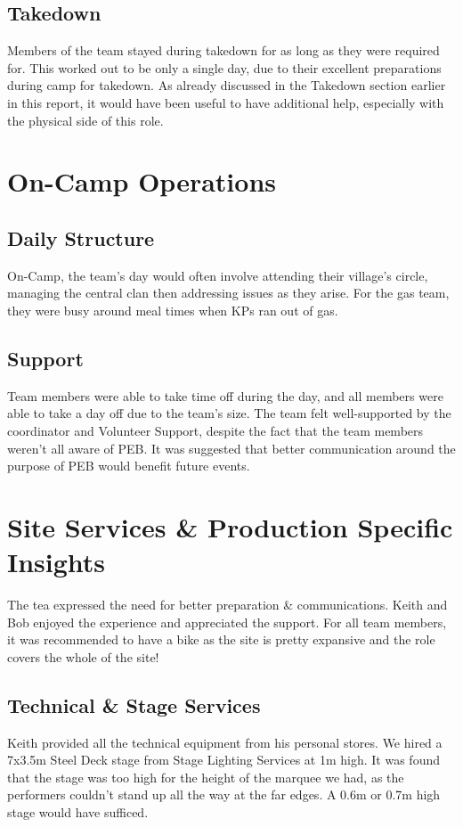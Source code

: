 \subsection{Takedown}
Members of the team stayed during takedown for as long as they were required for. This worked out to be only a single day, due to their excellent preparations during camp for takedown. As already discussed in the Takedown section earlier in this report, it would have been useful to have additional help, especially with the physical side of this role. 

\section{On-Camp Operations}
\subsection{Daily Structure}
On-Camp, the team's day would often involve attending their village's circle, managing the central clan then addressing issues as they arise. For the gas team, they were busy around meal times when KPs ran out of gas. 
\subsection{Support}
Team members were able to take time off during the day, and all members were able to take a day off due to the team's size. The team felt well-supported by the coordinator and Volunteer Support, despite the fact that the team members weren't all aware of PEB. It was suggested that better communication around the purpose of PEB would benefit future events. 

\section{Site Services \& Production Specific Insights}
The tea expressed the need for better preparation \& communications. Keith and Bob enjoyed the experience and appreciated the support. For all team members, it was recommended to have a bike as the site is pretty expansive and the role covers the whole of the site! 
\subsection{Technical \& Stage Services}
Keith provided all the technical equipment from his personal stores. We hired a 7x3.5m Steel Deck stage from Stage Lighting Services at 1m high. It was found that the stage was too high for the height of the marquee we had, as the performers couldn't stand up all the way at the far edges. A 0.6m or 0.7m high stage would have sufficed. \\

